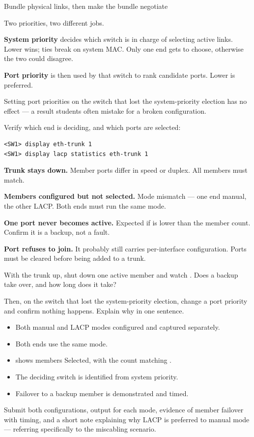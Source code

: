\begin{labproject}{Bundle physical links, then make the bundle negotiate}
\begin{keyidea}
Two priorities, two different jobs.

\textbf{System priority} decides which switch is in charge of selecting active links. Lower wins; ties break on system MAC. Only one end gets to choose, otherwise the two could disagree.

\textbf{Port priority} is then used by that switch to rank candidate ports. Lower is preferred.

Setting port priorities on the switch that lost the system-priority election has no effect --- a result students often mistake for a broken configuration.
\end{keyidea}

Verify which end is deciding, and which ports are selected:

\begin{lstlisting}[style=dcnterminal]
<SW1> display eth-trunk 1
<SW1> display lacp statistics eth-trunk 1
\end{lstlisting}

\begin{troubleshoot}
\textbf{Trunk stays down.} Member ports differ in speed or duplex. All members must match.

\textbf{Members configured but not selected.} Mode mismatch --- one end manual, the other LACP. Both ends must run the same mode.

\textbf{One port never becomes active.} Expected if  is lower than the member count. Confirm it is a backup, not a fault.

\textbf{Port refuses to join.} It probably still carries per-interface configuration. Ports must be cleared before being added to a trunk.
\end{troubleshoot}

\begin{tryit}
With the trunk up, shut down one active member and watch . Does a backup take over, and how long does it take?

Then, on the switch that lost the system-priority election, change a port priority and confirm nothing happens. Explain why in one sentence.
\end{tryit}
\end{labproject}

\begin{verifybox}
\begin{itemize}
  \item Both manual and LACP modes configured and captured separately.
  \item Both ends use the same mode.
  \item {} shows members Selected, with the count matching .
  \item The deciding switch is identified from system priority.
  \item Failover to a backup member is demonstrated and timed.
\end{itemize}
\end{verifybox}

\begin{labdeliverable}
Submit both configurations,  output for each mode, evidence of member failover with timing, and a short note explaining why LACP is preferred to manual mode --- referring specifically to the miscabling scenario.
\end{labdeliverable}
